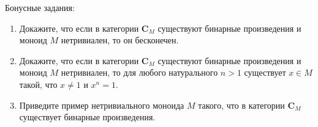 \documentclass[draft]{article}
\newcommand{\cat}[1]{\mathbf{#1}}
\renewcommand{\C}{\cat{C}}
\begin{document}
Бонусные задания:

\begin{enumerate}

\item Докажите, что если в категории $\C_M$ существуют бинарные произведения и моноид $M$ нетривиален, то он бесконечен.

\item Докажите, что если в категории $\C_M$ существуют бинарные произведения и моноид $M$ нетривиален, то для любого натурального $n > 1$ существует $x \in M$ такой, что $x \neq 1$ и $x^n = 1$.

\item Приведите пример нетривиального моноида $M$ такого, что в категории $\C_M$ существует бинарные произведения.

\end{enumerate}
\end{document}
